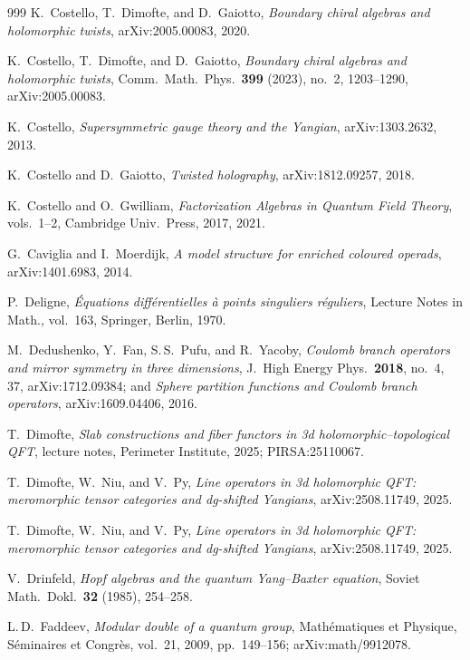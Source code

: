\documentclass[11pt]{memoir}
\begin{document}
\begin{thebibliography}{999}
 K.~Costello, T.~Dimofte, and D.~Gaiotto, \emph{Boundary chiral algebras and holomorphic twists}, arXiv:2005.00083, 2020.

 K.~Costello, T.~Dimofte, and D.~Gaiotto, \emph{Boundary chiral algebras and holomorphic twists}, Comm.\ Math.\ Phys.\ \textbf{399} (2023), no.~2, 1203--1290, arXiv:2005.00083.

 K.~Costello, \emph{Supersymmetric gauge theory and the Yangian}, arXiv:1303.2632, 2013.

 K.~Costello and D.~Gaiotto, \emph{Twisted holography}, arXiv:1812.09257, 2018.

 K.~Costello and O.~Gwilliam, \emph{Factorization Algebras in Quantum Field Theory}, vols.~1--2, Cambridge Univ.\ Press, 2017, 2021.

 G.~Caviglia and I.~Moerdijk, \emph{A model structure for enriched coloured operads}, arXiv:1401.6983, 2014.

 P.~Deligne, \emph{\'Equations diff\'erentielles \`a points singuliers r\'eguliers}, Lecture Notes in Math., vol.~163, Springer, Berlin, 1970.

 M.~Dedushenko, Y.~Fan, S.\,S.~Pufu, and R.~Yacoby, \emph{Coulomb branch operators and mirror symmetry in three dimensions}, J.\ High Energy Phys.\ \textbf{2018}, no.~4, 37, arXiv:1712.09384; and \emph{Sphere partition functions and Coulomb branch operators}, arXiv:1609.04406, 2016.

 T.~Dimofte, \emph{Slab constructions and fiber functors in 3d holomorphic--topological QFT}, lecture notes, Perimeter Institute, 2025; PIRSA:25110067.

 T.~Dimofte, W.~Niu, and V.~Py, \emph{Line operators in 3d holomorphic QFT: meromorphic tensor categories and dg-shifted Yangians}, arXiv:2508.11749, 2025.

 T.~Dimofte, W.~Niu, and V.~Py, \emph{Line operators in 3d holomorphic QFT: meromorphic tensor categories and dg-shifted Yangians}, arXiv:2508.11749, 2025.

 V.~Drinfeld, \emph{Hopf algebras and the quantum Yang--Baxter equation}, Soviet Math.\ Dokl.\ \textbf{32} (1985), 254--258.

 L.\,D.~Faddeev, \emph{Modular double of a quantum group}, Math\'ematiques et Physique, S\'eminaires et Congr\`es, vol.~21, 2009, pp.~149--156; arXiv:math/9912078.


\end{thebibliography}
\end{document}
